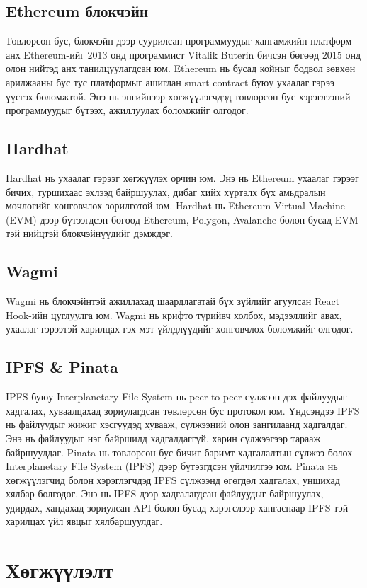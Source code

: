\subsection{Ethereum блокчэйн}
Төвлөрсөн бус, блокчэйн дээр суурилсан программуудыг хангамжийн платформ анх Ethereum-ийг 2013 онд программист Vitalik Buterin бичсэн бөгөөд 2015 онд олон нийтэд анх танилцуулагдсан юм. Ethereum нь бусад койныг бодвол зөвхөн арилжааны бус тус платформыг ашиглан smart contract буюу ухаалаг гэрээ үүсгэх боломжтой. Энэ нь энгийнээр хөгжүүлэгчдэд төвлөрсөн бус хэрэглээний программуудыг бүтээх, ажиллуулах боломжийг олгодог.

\subsection{Hardhat}
Hardhat нь ухаалаг гэрээг хөгжүүлэх орчин юм. Энэ нь Ethereum ухаалаг гэрээг бичих, туршихаас эхлээд байршуулах, дибаг хийх хүртэлх бүх амьдралын мөчлөгийг хөнгөвчлөх зорилготой юм. Hardhat нь Ethereum Virtual Machine (EVM) дээр бүтээгдсэн бөгөөд Ethereum, Polygon, Avalanche болон бусад EVM-тэй нийцтэй блокчэйнүүдийг дэмждэг.

\subsection{Wagmi}
Wagmi нь блокчэйнтэй ажиллахад шаардлагатай бүх зүйлийг агуулсан React Hook-ийн цуглуулга юм. Wagmi нь крифто түрийвч холбох, мэдээллийг авах, ухаалаг гэрээтэй харилцах гэх мэт үйлдлүүдийг хөнгөвчлөх боломжийг олгодог.

\subsection{IPFS \& Pinata}
IPFS буюу Interplanetary File System нь peer-to-peer сүлжээн дэх файлуудыг хадгалах, хуваалцахад зориулагдсан төвлөрсөн бус протокол юм. Үндсэндээ IPFS нь файлуудыг жижиг хэсгүүдэд хувааж, сүлжээний олон зангилаанд хадгалдаг. Энэ нь файлуудыг нэг байршилд хадгалдаггүй, харин сүлжээгээр тарааж байршуулдаг.
Pinata нь төвлөрсөн бус бичиг баримт хадгалалтын сүлжээ болох Interplanetary File System (IPFS) дээр бүтээгдсэн үйлчилгээ юм. Pinata нь хөгжүүлэгчид болон хэрэглэгчдэд IPFS сүлжээнд өгөгдөл хадгалах, уншихад хялбар болгодог. Энэ нь IPFS дээр хадгалагдсан файлуудыг байршуулах, удирдах, хандахад зориулсан API болон бусад хэрэгслээр хангаснаар IPFS-тэй харилцах үйл явцыг хялбаршуулдаг.

\newpage
\section{Хөгжүүлэлт}


